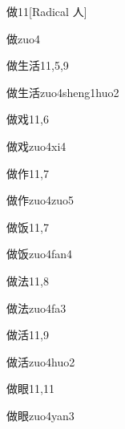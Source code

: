 \begin{entry}{做}{11}[Radical 人]
  \begin{phonetics}{做}{zuo4}
  \end{phonetics}
\end{entry}

\begin{entry}{做生活}{11,5,9}
  \begin{phonetics}{做生活}{zuo4sheng1huo2}
  \end{phonetics}
\end{entry}

\begin{entry}{做戏}{11,6}
  \begin{phonetics}{做戏}{zuo4xi4}
  \end{phonetics}
\end{entry}

\begin{entry}{做作}{11,7}
  \begin{phonetics}{做作}{zuo4zuo5}
  \end{phonetics}
\end{entry}

\begin{entry}{做饭}{11,7}
  \begin{phonetics}{做饭}{zuo4fan4}
  \end{phonetics}
\end{entry}

\begin{entry}{做法}{11,8}
  \begin{phonetics}{做法}{zuo4fa3}
  \end{phonetics}
\end{entry}

\begin{entry}{做活}{11,9}
  \begin{phonetics}{做活}{zuo4huo2}
  \end{phonetics}
\end{entry}

\begin{entry}{做眼}{11,11}
  \begin{phonetics}{做眼}{zuo4yan3}
  \end{phonetics}
\end{entry}

